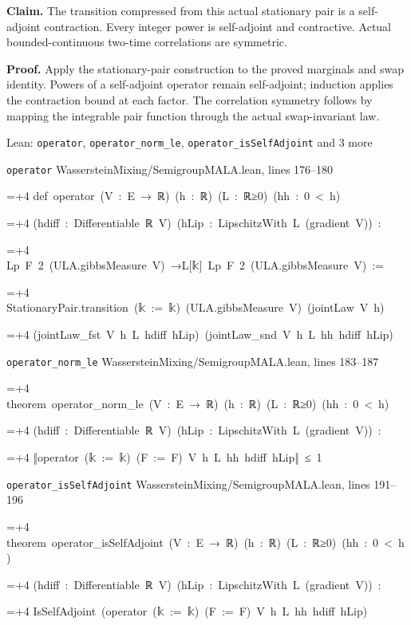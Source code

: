 \documentclass[11pt,a4paper]{article}
\newlength{\leancharwidth}
\newenvironment{leancode}{\par\smallskip\begingroup\ttfamily\footnotesize\raggedright
  \settowidth{\leancharwidth}{M}\setlength{\parskip}{0pt}\setlength{\parindent}{0pt}
  \frenchspacing}{\par\endgroup\smallskip}
\newcommand{\leanline}[2]{\hangindent=\dimexpr#1\leancharwidth+4\leancharwidth\relax
  \hangafter=1\noindent\hspace*{#1\leancharwidth}#2\par}
\newcommand{\leansource}[1]{\par{\footnotesize\color{leanmuted}#1}\par}
\begin{document}
\textbf{Claim.} The transition compressed from this actual stationary pair is a self-adjoint contraction. Every integer power is self-adjoint and contractive. Actual bounded-continuous two-time correlations are symmetric.



\textbf{Proof.} Apply the stationary-pair construction to the proved marginals and swap identity. Powers of a self-adjoint operator remain self-adjoint; induction applies the contraction bound at each factor. The correlation symmetry follows by mapping the integrable pair function through the actual swap-invariant law.

\begin{leanbox}{Lean: \texttt{operator}, \texttt{operator\_\allowbreak{}norm\_\allowbreak{}le}, \texttt{operator\_\allowbreak{}isSelfAdjoint} and 3 more}
\leansource{\texttt{operator} \quad WassersteinMixing/\allowbreak{}SemigroupMALA.lean, lines 176–180}
\begin{leancode}
\leanline{0}{def\ operator\ (V\ :\ E\ →\ ℝ)\ (h\ :\ ℝ)\ (L\ :\ ℝ≥0)\ (hh\ :\ 0\ <\ h)}
\leanline{4}{(hdiff\ :\ Differentiable\ ℝ\ V)\ (hLip\ :\ LipschitzWith\ L\ (gradient\ V))\ :}
\leanline{4}{Lp\ F\ 2\ (ULA.gibbsMeasure\ V)\ →L[{\leanfallback 𝕜}]\ Lp\ F\ 2\ (ULA.gibbsMeasure\ V)\ :=}
\leanline{2}{StationaryPair.transition\ ({\leanfallback 𝕜}\ :=\ {\leanfallback 𝕜})\ (ULA.gibbsMeasure\ V)\ (jointLaw\ V\ h)}
\leanline{4}{(jointLaw\_fst\ V\ h\ L\ hdiff\ hLip)\ (jointLaw\_snd\ V\ h\ L\ hh\ hdiff\ hLip)}
\end{leancode}
\leansource{\texttt{operator\_\allowbreak{}norm\_\allowbreak{}le} \quad WassersteinMixing/\allowbreak{}SemigroupMALA.lean, lines 183–187}
\begin{leancode}
\leanline{0}{theorem\ operator\_norm\_le\ (V\ :\ E\ →\ ℝ)\ (h\ :\ ℝ)\ (L\ :\ ℝ≥0)\ (hh\ :\ 0\ <\ h)}
\leanline{4}{(hdiff\ :\ Differentiable\ ℝ\ V)\ (hLip\ :\ LipschitzWith\ L\ (gradient\ V))\ :}
\leanline{4}{‖operator\ ({\leanfallback 𝕜}\ :=\ {\leanfallback 𝕜})\ (F\ :=\ F)\ V\ h\ L\ hh\ hdiff\ hLip‖\ ≤\ 1}
\end{leancode}
\leansource{\texttt{operator\_\allowbreak{}isSelfAdjoint} \quad WassersteinMixing/\allowbreak{}SemigroupMALA.lean, lines 191–196}
\begin{leancode}
\leanline{0}{theorem\ operator\_isSelfAdjoint\ (V\ :\ E\ →\ ℝ)\ (h\ :\ ℝ)\ (L\ :\ ℝ≥0)\ (hh\ :\ 0\ <\ h)}
\leanline{4}{(hdiff\ :\ Differentiable\ ℝ\ V)\ (hLip\ :\ LipschitzWith\ L\ (gradient\ V))\ :}
\leanline{4}{IsSelfAdjoint\ (operator\ ({\leanfallback 𝕜}\ :=\ {\leanfallback 𝕜})\ (F\ :=\ F)\ V\ h\ L\ hh\ hdiff\ hLip)}

\end{leancode}
\end{leanbox}
\end{document}
